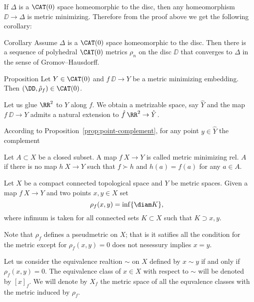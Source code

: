 


If $\Delta$ is a $\CAT(0)$ space homeomorphic to the disc, then any homeomorphism $\DD\to \Delta$ is metric minimizing.
Therefore from the proof above we get the following corollary:

\begin{thm}{Corollary}
Assume $\Delta$ is a $\CAT(0)$ space homeomorphic to the disc.
Then there is a sequence of polyhedral $\CAT(0)$ metrics $\rho_n$ on the disc $\DD$ that converges to $\Delta$ in the sense of Gromov--Hausdorff.
\end{thm}













\begin{thm}{Proposition}
Let $Y\in\CAT(0)$ 
and 
$f\:\DD\to Y$ be a metric minimizing embedding.
Then $(\DD,\hat\rho_f)\in \CAT(0)$.
\end{thm}



Let us glue $\RR^2$ to $Y$ along $f$.
We obtain a metrizable space, say $\hat Y$
and the map $f\:\DD\to Y$ admits a natural extension to $\hat f\:\RR^2\to \hat Y$.

According to Proposition~\ref{prop:point-complement}, for any point $y\in \hat Y$ the complement 








Let $A\subset X$ be a closed subset.
A map $f\:X\to Y$ is called metric minimizing rel. $A$
if there is no map $h\:X\to Y$ such that $f\succ h$ and $h(a)=f(a)$ for any $a\in A$.


Let $X$ be a compact connected topological space
and $Y$ be metric spaces.
Given a map $f\:X\to Y$ and two points $x,y\in X$
set 
\[\rho_f(x,y)=\inf\{\diam K\},\]
where infimum is taken for all connected sets $K\subset X$
such that $K\supset x,y$.

Note that $\rho_f$ defines a pseudmetric on $X$;
that is it satifies all the condition for the metric except for $\rho_f(x,y)=0$ does not nesessury implies $x=y$.


Let us consider the equivalence realtion $\sim$ on $X$ 
defined by
$x\sim y$ if and only if $\rho_f(x,y)=0$.
The equivalence class of $x\in X$ with respect to $\sim$
will be denoted by $[x]_f$.
We will denote by $X_f$ 
the metric space of all the equvalence classes with the metric induced by $\rho_f$.

